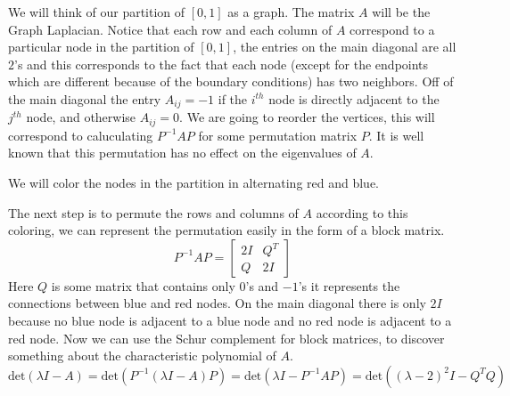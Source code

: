 \documentclass{article}
\newcommand{\beq}{\begin{equation}}
\newcommand{\eeq}{\end{equation}}
\theoremstyle{remark}
\begin{document}
We will think of our partition of $[0,1]$ as a graph. The matrix $A$ will be the Graph Laplacian. Notice that each row and each column of $A$ correspond to a particular node in the partition of $[0,1]$, the entries on the main diagonal are all $2$'s and this corresponds to the fact that each node (except for the endpoints which are different because of the boundary conditions) has two neighbors. Off of the main diagonal the entry $A_{ij} =-1$ if the $i^{th}$ node is directly adjacent to the $j^{th}$ node, and otherwise $A_{ij} =0$. We are going to reorder the vertices, this will correspond to caluculating $P^{-1}AP$ for some permutation matrix $P$. It is well known that this permutation has no effect on the eigenvalues of $A$.

We will color the nodes in the partition in alternating red and blue. 
\begin{center}
\end{center}

The next step is to permute the rows and columns of $A$ according to this coloring, we can represent the permutation easily in the form of a block matrix. 
\beq
P^{-1}AP = \begin{bmatrix} 2I & Q^T\\
Q & 2I
\end{bmatrix}
\eeq
Here $Q$ is some matrix that contains only $0$'s and $-1$'s it represents the connections between blue and red nodes. On the main diagonal there is only $2I$ because no blue node is adjacent to a blue node and no red node is adjacent to a red node. Now we can use the Schur complement for block matrices, to discover something about the characteristic polynomial of $A$.
\beq
\text{det}(\lambda I-A) = \text{det}(P^{-1}(\lambda I-A)P) = \text{det}(\lambda I-P^{-1}AP) = \text{det}((\lambda-2)^2I - Q^TQ)
\eeq
\end{document}
